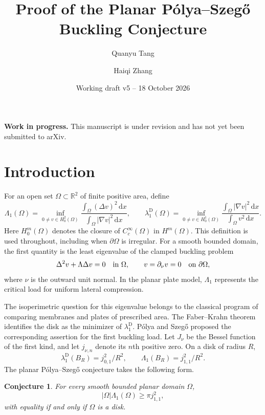 \documentclass[11pt,letterpaper,reqno]{amsart}
\newtheorem{conjecture}[theorem]{Conjecture}
\theoremstyle{definition}
\newcommand{\dd}{\,\mathrm d}
\begin{document}
\title{Proof of the Planar P\'olya--Szeg\H{o} Buckling Conjecture}


\author[Q.~Tang]{Quanyu Tang}
\address{School of Mathematical Sciences, University of Science and Technology of China, Hefei 230026, P.~R.~China}

\author[H.~Zhang]{Haiqi Zhang}
\address{School of Mathematics, Shandong University, Jinan 250100, P.~R.~China}

\date{Working draft v5 -- 18 October 2026}

\maketitle

\begin{center}
\small\textbf{Work in progress.} This manuscript is under revision
and has not yet been submitted to arXiv.
\end{center}

\section{Introduction}
For an open set $\Omega\subset\mathbb R^2$ of finite positive area, define
\[
 \Lambda_1(\Omega)=\inf_{0\ne v\in H_0^2(\Omega)}
       \frac{\int_\Omega(\Delta v)^2\dd x}
            {\int_\Omega|\nabla v|^2\dd x},\qquad
 \lambda_1^{\mathrm D}(\Omega)=\inf_{0\ne v\in H_0^1(\Omega)}
       \frac{\int_\Omega|\nabla v|^2\dd x}
            {\int_\Omega v^2\dd x}.
\]
Here $H_0^m(\Omega)$ denotes the closure of $C_c^\infty(\Omega)$
in $H^m(\Omega)$. This definition is used throughout, including when
$\partial\Omega$ is irregular. For a smooth bounded domain, the first
quantity is the least eigenvalue of the clamped buckling problem
\[
 \Delta^2v+\Lambda\Delta v=0\quad\hbox{in }\Omega,
 \qquad v=\partial_\nu v=0\quad\hbox{on }\partial\Omega,
\]
where $\nu$ is the outward unit normal. In the planar plate model,
$\Lambda_1$ represents the critical load for uniform lateral compression.

The isoperimetric question for this eigenvalue belongs to the classical
program of comparing membranes and plates of prescribed area. The
Faber--Krahn theorem \cite{Faber,Krahn} identifies the disk as the
minimizer of $\lambda_1^{\mathrm D}$. P\'olya and Szeg\H{o}
\cite{PS} proposed the corresponding assertion for the first buckling
load. Let $J_\nu$ be the Bessel function of the first kind, and let
$j_{\nu,n}$ denote its $n$th positive zero. On a disk of radius $R$,
\[
 \lambda_1^{\mathrm D}(B_R)=j_{0,1}^2/R^2,
 \qquad \Lambda_1(B_R)=j_{1,1}^2/R^2.
\]
The planar P\'olya--Szeg\H{o} conjecture takes the following form.
\begin{conjecture}\label{conj:PS}
For every smooth bounded planar domain $\Omega$,
\[
 |\Omega|\Lambda_1(\Omega)\ge\pi j_{1,1}^2,
\]
with equality if and only if $\Omega$ is a disk.
\end{conjecture}
\end{document}
